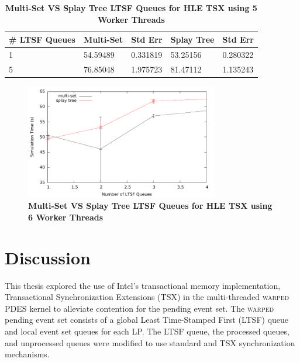 \documentclass[11pt]{book}
\begin{document}
\begin{table}
\centering
\begin{tabular}{l|p{2cm}|p{2cm}|p{2cm}|p{2cm}}
    \textbf{\# LTSF Queues}&Multi-Set &Std Err &Splay Tree &Std Err\\
    \hline
    \midrule
        1 &54.59489   &0.331819 &53.25156   &0.280322\\ 
        5 &76.85048   &1.975723 &81.47112   &1.135243\\
\end{tabular}
\caption{\textbf{Multi-Set VS Splay Tree LTSF Queues for HLE TSX using 5 Worker
    Threads}}\label{tab:noThrMig_5threadsXschq_msVSst_hle}
\end{table}

\begin{figure}
    \centering
    \graphicspath{ {./figures/} }
    \includegraphics[width=0.75\textwidth,keepaspectratio]{hugeepidemicsim-NOmig-timeVSschedQs-msVSst-6thread-hle}
\caption{\textbf{Multi-Set VS Splay Tree LTSF Queues for HLE TSX using 6 Worker
    Threads}}\label{fig:noThrMig_timeVSschq_6threads_msVSst_hle}
\end{figure}


\chapter{Discussion}

This thesis explored the use of Intel's transactional memory implementation, Transactional
Synchronization Extensions (TSX) in the multi-threaded \textsc{warped} PDES kernel to
alleviate contention for the pending event set.  The \textsc{warped} pending event set
consists of a global Least Time-Stamped First (LTSF) queue and local event set queues for
each LP.  The LTSF queue, the processed queues, and unprocessed queues were modified to
use standard and TSX synchronization mechanisms.
\end{document}
